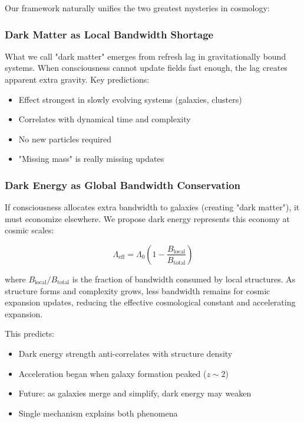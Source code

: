 \documentclass[twocolumn,prd,amsmath,amssymb,aps,superscriptaddress,nofootinbib]{revtex4-2}
\begin{document}
Our framework naturally unifies the two greatest mysteries in cosmology:

\subsubsection{Dark Matter as Local Bandwidth Shortage}

What we call "dark matter" emerges from refresh lag in gravitationally bound systems. When consciousness cannot update fields fast enough, the lag creates apparent extra gravity. Key predictions:
\begin{itemize}
\item Effect strongest in slowly evolving systems (galaxies, clusters)
\item Correlates with dynamical time and complexity
\item No new particles required
\item "Missing mass" is really missing updates
\end{itemize}

\subsubsection{Dark Energy as Global Bandwidth Conservation}

If consciousness allocates extra bandwidth to galaxies (creating "dark matter"), it must economize elsewhere. We propose dark energy represents this economy at cosmic scales:

\begin{equation}
\Lambda_{\text{eff}} = \Lambda_0 \left(1 - \frac{B_{\text{local}}}{B_{\text{total}}}\right)
\label{eq:dark_energy}
\end{equation}

where $B_{\text{local}}/B_{\text{total}}$ is the fraction of bandwidth consumed by local structures. As structure forms and complexity grows, less bandwidth remains for cosmic expansion updates, reducing the effective cosmological constant and accelerating expansion.

This predicts:
\begin{itemize}
\item Dark energy strength anti-correlates with structure density
\item Acceleration began when galaxy formation peaked ($z \sim 2$)
\item Future: as galaxies merge and simplify, dark energy may weaken
\item Single mechanism explains both phenomena
\end{itemize}
\end{document}
